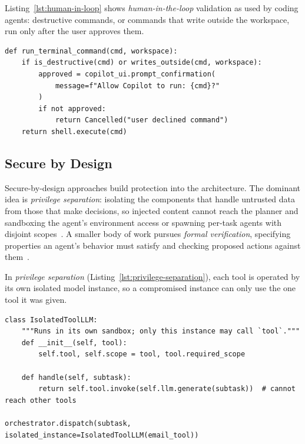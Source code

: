 Listing~\ref{lst:human-in-loop} shows \emph{human-in-the-loop} validation as used by coding agents: destructive commands, or commands that write outside the workspace, run only after the user approves them.

\noindent\begin{minipage}{\linewidth}
\begin{lstlisting}[caption={Human-in-the-loop: command approval before execution, as in GitHub Copilot Workspace~\cite{github-copilot}.}, label={lst:human-in-loop}]
def run_terminal_command(cmd, workspace):
    if is_destructive(cmd) or writes_outside(cmd, workspace):
        approved = copilot_ui.prompt_confirmation(
            message=f"Allow Copilot to run: {cmd}?"
        )
        if not approved:
            return Cancelled("user declined command")
    return shell.execute(cmd)
\end{lstlisting}
\end{minipage}


\subsection{Secure by Design}
Secure-by-design approaches build protection into the architecture. The dominant idea is \emph{privilege separation}: isolating the components that handle untrusted data from those that make decisions, so injected content cannot reach the planner and sandboxing the agent's environment access or spawning per-task agents with disjoint scopes~\cite{wu2025isolategpt,bagdasarian2024airgap}. A smaller body of work pursues \emph{formal verification}, specifying properties an agent's behavior must satisfy and checking proposed actions against them~\cite{chen2025shieldagent}.

In \emph{privilege separation} (Listing~\ref{lst:privilege-separation}), each tool is operated by its own isolated model instance, so a compromised instance can only use the one tool it was given.

\noindent\begin{minipage}{\linewidth}
\begin{lstlisting}[caption={Privilege separation: per-tool isolated LLM instances, in the style of IsolateGPT~\cite{wu2025isolategpt}.}, label={lst:privilege-separation}]
class IsolatedToolLLM:
    """Runs in its own sandbox; only this instance may call `tool`."""
    def __init__(self, tool):
        self.tool, self.scope = tool, tool.required_scope

    def handle(self, subtask):
        return self.tool.invoke(self.llm.generate(subtask))  # cannot reach other tools

orchestrator.dispatch(subtask, isolated_instance=IsolatedToolLLM(email_tool))
\end{lstlisting}
\end{minipage}

